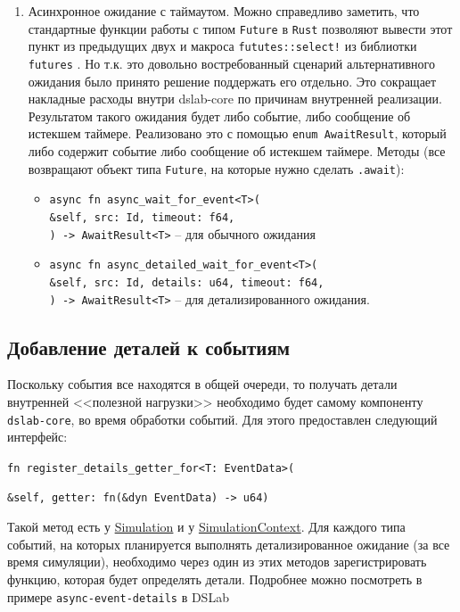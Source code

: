 \begin{enumerate}
\begin{itemize}
    \end{itemize}
    \item Асинхронное ожидание с таймаутом. Можно справедливо заметить, что стандартные функции работы с типом \texttt{Future} в \texttt{Rust} позволяют вывести этот пункт из предыдущих двух и макроса \texttt{fututes::select!} из библиотки \texttt{futures} \cite{rust-futures}. Но т.к. это довольно востребованный сценарий альтернативного ожидания было принято решение поддержать его отдельно. Это сокращает накладные расходы внутри dslab-core по причинам внутренней реализации. Результатом такого ожидания будет либо событие, либо сообщение об истекшем таймере. Реализовано это с помощью \texttt{enum AwaitResult}, который либо содержит событие либо сообщение об истекшем таймере. Методы (все возвращают объект типа \texttt{Future}, на которые нужно сделать \texttt{.await}):
    \begin{itemize}
        \item \texttt{async fn async\_wait\_for\_event<T>(\\\&self, src: Id, timeout: f64,\\) -> AwaitResult<T>} -- для обычного ожидания
        \item \texttt{async fn async\_detailed\_wait\_for\_event<T>(\\\&self, src: Id, details: u64, timeout: f64,\\) -> AwaitResult<T>} -- для детализированного ожидания. 
    \end{itemize}
\end{enumerate}

\subsection{Добавление деталей к событиям}\label{add-details-getters}

Поскольку события все находятся в общей очереди, то получать детали внутренней <<полезной нагрузки>> необходимо будет самому компоненту \texttt{dslab-core}, во время обработки событий. Для этого предоставлен следующий интерфейс:
\begin{flushleft}
     \texttt{fn register\_details\_getter\_for<T: EventData>(}
\end{flushleft}
\vspace{-1.2cm}
\begin{flushright}
      \texttt{\&self, getter: fn(\&dyn EventData) -> u64)}
\end{flushright}

Такой метод есть у \hyperref[Simulation]{Simulation} и у \hyperref[SimulationContext]{SimulationContext}. Для каждого типа событий, на которых планируется выполнять детализированное ожидание (за все время симуляции), необходимо через один из этих методов зарегистрировать функцию, которая будет определять детали. Подробнее можно посмотреть в примере \texttt{async-event-details} в DSLab \cite{async-event-details-example}

